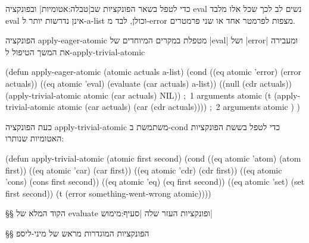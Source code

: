 כדי לטפל בשאר הפונקציות שב|טבלה:אטומיות| ובפונקציה eval נשים לב לכך שכל אלו
מלבד eval אינן נדרשות יותר ל-a-list וכולן, לבד מ-error מצפות לפרמטר אחד או שני
פרמטרים.

הפונקציה apply-eager-atomic מטפלת במקרים המיוחדים של \E|eval| ושל \E|error|
ומעבירה את המשך הטיפול ל-apply-trivial-atomic
\begin{KERNEL}
(defun apply-eager-atomic (atomic actuals a-list)
  (cond
    ((eq atomic 'error) (error actuals))
    ((eq atomic 'eval) (evaluate (car actuals) a-list))
    ((null (cdr actuals)) (apply-trivial-atomic atomic (car actuals) NIL)) ;~1 arguments atomic
    (t (apply-trivial-atomic atomic (car actuals) (car (cdr actuals)))) ;~2 arguments atomic
)
)
\end{KERNEL}

כעת הפונקציה apply-trivial-atomic משתמשת ב-cond כדי לטפל בששת הפונקציות האטומיות שנותרו:
\begin{KERNEL}
(defun apply-trivial-atomic (atomic first second)
  (cond ((eq atomic 'atom) (atom first))
        ((eq atomic 'car) (car first))
        ((eq atomic 'cdr) (cdr first))
        ((eq atomic 'cons) (cons first second))
        ((eq atomic 'eq) (eq first second))
        ((eq atomic 'set) (set first second))
        (t (error something-went-wrong atomic))))
\end{KERNEL}

§§ הקוד המלא של evaluate ופונקציות העזר שלה
|סעיף:מימוש|

\immediate \closeout {}
\begin{LTR}
  
\end{LTR}

§§ הפונקציות המוגדרות מראש של מיני-ליספ

